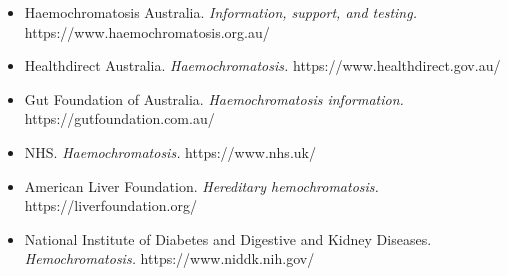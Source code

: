 \begin{itemize}
    \item Haemochromatosis Australia. \textit{Information, support, and testing.} https://www.haemochromatosis.org.au/
    \item Healthdirect Australia. \textit{Haemochromatosis.} https://www.healthdirect.gov.au/
    \item Gut Foundation of Australia. \textit{Haemochromatosis information.} https://gutfoundation.com.au/
    \item NHS. \textit{Haemochromatosis.} https://www.nhs.uk/
    \item American Liver Foundation. \textit{Hereditary hemochromatosis.} https://liverfoundation.org/
    \item National Institute of Diabetes and Digestive and Kidney Diseases. \textit{Hemochromatosis.} https://www.niddk.nih.gov/
\end{itemize}
